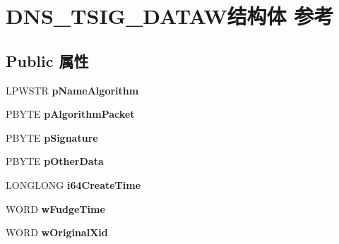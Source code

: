 \hypertarget{struct_d_n_s___t_s_i_g___d_a_t_a_w}{}\section{D\+N\+S\+\_\+\+T\+S\+I\+G\+\_\+\+D\+A\+T\+A\+W结构体 参考}
\label{struct_d_n_s___t_s_i_g___d_a_t_a_w}
\subsection*{Public 属性}
\begin{DoxyCompactItemize}
\item 
\mbox{\label{struct_d_n_s___t_s_i_g___d_a_t_a_w_a4dd7cd8c865166ef21fa2751da8eca5f}} 
L\+P\+W\+S\+TR {\bfseries p\+Name\+Algorithm}
\item 
\mbox{\label{struct_d_n_s___t_s_i_g___d_a_t_a_w_aec7de38e93be8c741e26b291351c9a8d}} 
P\+B\+Y\+TE {\bfseries p\+Algorithm\+Packet}
\item 
\mbox{\label{struct_d_n_s___t_s_i_g___d_a_t_a_w_a8a7603f4a773c509a30f6150c78cffa3}} 
P\+B\+Y\+TE {\bfseries p\+Signature}
\item 
\mbox{\label{struct_d_n_s___t_s_i_g___d_a_t_a_w_affe828bf70ed1a701a462a1747fb8ece}} 
P\+B\+Y\+TE {\bfseries p\+Other\+Data}
\item 
\mbox{\label{struct_d_n_s___t_s_i_g___d_a_t_a_w_a24c16509c8453ba2f750416e3035112f}} 
L\+O\+N\+G\+L\+O\+NG {\bfseries i64\+Create\+Time}
\item 
\mbox{\label{struct_d_n_s___t_s_i_g___d_a_t_a_w_aa0caf71e58313d6ae3dbf24bf44255a0}} 
W\+O\+RD {\bfseries w\+Fudge\+Time}
\item 
\mbox{\label{struct_d_n_s___t_s_i_g___d_a_t_a_w_af6f3c066e3207517a912c77cfa024636}} 
W\+O\+RD {\bfseries w\+Original\+Xid}
\item 
\mbox{\label{struct_d_n_s___t_s_i_g___d_a_t_a_w_a9169c59f50ef2e46424499a18597c571}} 

\end{DoxyCompactItemize}
